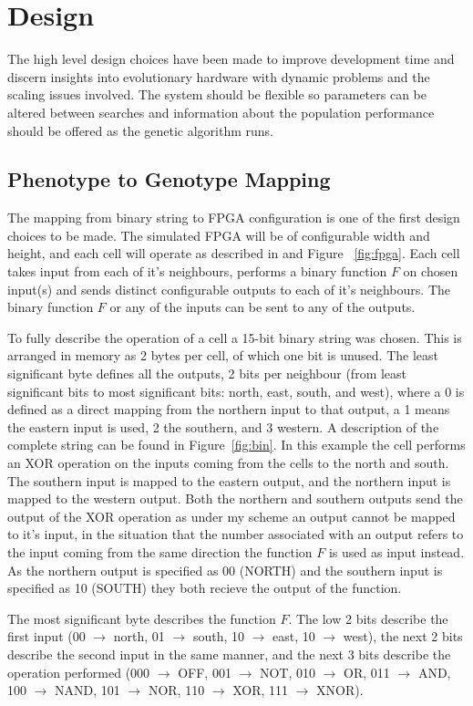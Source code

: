 \section{Design}
The high level design choices have been made to improve development time
and discern insights into evolutionary hardware with dynamic problems and
the scaling issues involved. The system should be flexible so parameters can
be altered between searches and information
about the population performance should be offered as the genetic algorithm runs.

\subsection{Phenotype to Genotype Mapping}
The mapping from binary string to FPGA configuration is one of the first design
choices to be made. The simulated FPGA will be of configurable width and height, and each
cell will operate as described in \cite{10.1007/3-540-63173-9_61} and Figure~
\ref{fig:fpga}. Each cell takes
input from each of it's neighbours, performs a binary function $F$ on chosen input(s)
and sends distinct configurable outputs to each of it's neighbours. The binary
function $F$ or any of the inputs can be sent to any of the outputs.

To fully describe the operation of a cell a 15-bit binary string was chosen.
This is arranged in memory as 2 bytes per cell, of which one bit is unused.
The least significant byte defines all the outputs, 2 bits per neighbour
(from least significant bits to most significant bits: north, east, south,
and west), where a 0 is defined as a direct mapping from the northern input
to that output, a 1 means the eastern input is used, 2 the southern, and 3
western.  A description of
the complete string can be found in Figure~\ref{fig:bin}. In this example
the cell performs an XOR operation on the inputs coming from the cells to
the north and south. The southern input is mapped to the eastern output,
and the northern input is mapped to the western output. Both the northern
and southern outputs send the output of the XOR operation as under my
scheme
an output cannot be mapped to it's input, in the situation that the
number associated with an output refers to the input coming from the same
direction the function $F$ is used as input instead. As the northern output
is specified as 00 (NORTH) and the southern input is specified as 10 (SOUTH)
they both recieve the output of the function.

The most significant byte describes the function $F$. The low 2 bits describe
the first input (00 $\rightarrow$ north, 01 $\rightarrow$ south, 10
$\rightarrow$ east, 10 $\rightarrow$ west), the next 2 bits describe the second
input in the same manner, and the next 3 bits describe the operation performed
(000 $\rightarrow$ OFF, 001 $\rightarrow$ NOT, 010 $\rightarrow$ OR, 011 $\rightarrow$
AND, 100 $\rightarrow$ NAND, 101 $\rightarrow$ NOR, 110 $\rightarrow$ XOR, 111
$\rightarrow$ XNOR).


